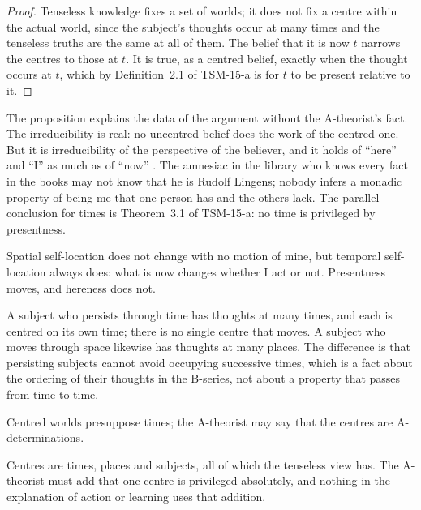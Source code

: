 \documentclass{situationist-preprint}
\begin{document}
\begin{proof}
Tenseless knowledge fixes a set of worlds; it does not fix a centre within the actual world, since the subject's thoughts occur at many times and the tenseless truths are the same at all of them. The belief that it is now $t$ narrows the centres to those at $t$. It is true, as a centred belief, exactly when the thought occurs at $t$, which by Definition~2.1 of TSM-15-a is for $t$ to be present relative to it.
\end{proof}

The proposition explains the data of the argument without the A-theorist's fact. The irreducibility is real: no uncentred belief does the work of the centred one. But it is irreducibility of the perspective of the believer, and it holds of \enquote{here} and \enquote{I} as much as of \enquote{now} \citep{Perry1979}. The amnesiac in the library who knows every fact in the books may not know that he is Rudolf Lingens; nobody infers a monadic property of being me that one person has and the others lack. The parallel conclusion for times is Theorem~3.1 of TSM-15-a: no time is privileged by presentness.

\begin{objection}
Spatial self-location does not change with no motion of mine, but temporal self-location always does: what is now changes whether I act or not. Presentness moves, and hereness does not.
\end{objection}

\begin{reply}
A subject who persists through time has thoughts at many times, and each is centred on its own time; there is no single centre that moves. A subject who moves through space likewise has thoughts at many places. The difference is that persisting subjects cannot avoid occupying successive times, which is a fact about the ordering of their thoughts in the B-series, not about a property that passes from time to time.
\end{reply}

\begin{objection}
Centred worlds presuppose times; the A-theorist may say that the centres are A-determinations.
\end{objection}

\begin{reply}
Centres are times, places and subjects, all of which the tenseless view has. The A-theorist must add that one centre is privileged absolutely, and nothing in the explanation of action or learning uses that addition.
\end{reply}
\end{document}
